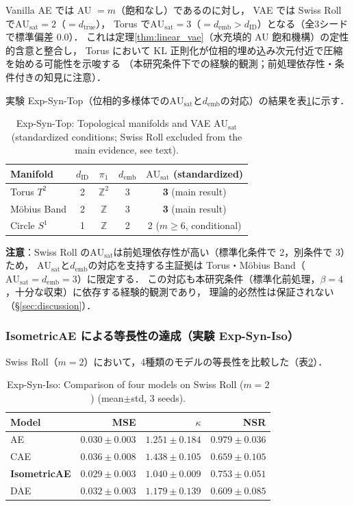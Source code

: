 \documentclass[11pt,a4paper]{jsarticle}
\newcommand{\dID}{d_{\mathrm{ID}}}
\newcommand{\dtrue}{d_{\mathrm{true}}}
\newcommand{\kap}{\kappa}
\newcommand{\AUsat}{\mathrm{AU}_{\mathrm{sat}}}
\newcommand{\demb}{d_{\mathrm{emb}}}
\begin{document}
Vanilla AE では AU $= m$（飽和なし）であるのに対し，
VAE では Swiss Roll で$\AUsat = 2$（$= \dtrue$），
Torus で$\AUsat = 3$（$= \demb > \dID$）となる（全3シードで標準偏差 0.0）．
これは定理\ref{thm:linear_vae}（水充填的 AU 飽和機構）の定性的含意と整合し，
Torus において KL 正則化が位相的埋め込み次元付近で圧縮を始める可能性を示唆する
（本研究条件下での経験的観測；前処理依存性・条件付きの知見に注意）．

実験 Exp-Syn-Top（位相的多様体での$\AUsat$と$\demb$の対応）の結果を表\ref{tab:eb_summary}に示す．

\begin{table}[H]
\centering
\caption{Exp-Syn-Top: Topological manifolds and VAE $\AUsat$ (standardized conditions; Swiss Roll excluded from the main evidence, see text).}
\label{tab:eb_summary}
\small
\begin{tabular}{lcccc}
\toprule
Manifold & $\dID$ & $\pi_1$ & $\demb$ & $\AUsat$ (standardized) \\
\midrule
Torus $T^2$  & 2 & $\mathbb{Z}^2$ & 3 & \textbf{3} (main result) \\
Möbius Band  & 2 & $\mathbb{Z}$   & 3 & \textbf{3} (main result) \\
Circle $S^1$ & 1 & $\mathbb{Z}$   & 2 & 2 ($m \geq 6$, conditional) \\
\bottomrule
\end{tabular}
\end{table}

\textbf{注意}：Swiss Roll の$\AUsat$は前処理依存性が高い（標準化条件で 2，別条件で 3）ため，
$\AUsat$と$\demb$の対応を支持する主証拠は Torus・Möbius Band（$\AUsat = \demb = 3$）に限定する．
この対応も本研究条件（標準化前処理，$\beta = 4$，十分な収束）に依存する経験的観測であり，
理論的必然性は保証されない（§\ref{sec:discussion}）．

\subsubsection{IsometricAE による等長性の達成（実験 Exp-Syn-Iso）}

Swiss Roll（$m = 2$）において，4種類のモデルの等長性を比較した（表\ref{tab:ec}）．

\begin{table}[H]
\centering
\caption{Exp-Syn-Iso: Comparison of four models on Swiss Roll ($m=2$) (mean$\pm$std, 3 seeds).}
\label{tab:ec}
\small
\begin{tabular}{lrrr}
\toprule
Model & MSE & $\kap$ & NSR \\
\midrule
AE & $0.030\pm0.003$ & $1.251\pm0.184$ & $0.979\pm0.036$ \\
CAE & $0.036\pm0.008$ & $1.438\pm0.105$ & $0.659\pm0.105$ \\
\textbf{IsometricAE} & $\boldsymbol{0.029\pm0.003}$ & $\boldsymbol{1.040\pm0.009}$ & $0.753\pm0.051$ \\
DAE & $0.032\pm0.003$ & $1.179\pm0.139$ & $0.609\pm0.085$ \\
\bottomrule
\end{tabular}
\end{table}
\end{document}
